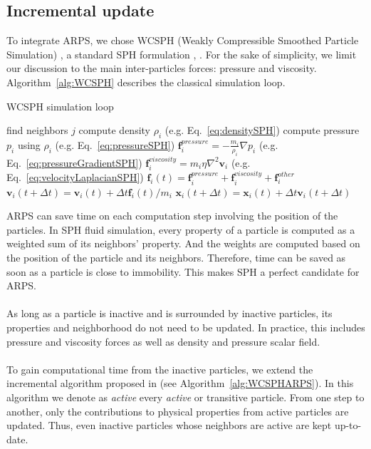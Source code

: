 \subsection{ Incremental update }
To integrate ARPS, we chose WCSPH (Weakly Compressible Smoothed Particle Simulation) \cite{Becker2007WCSPH}, a standard SPH formulation \cite{Desbrun1996}, \cite{Muller2003}. For the sake of simplicity, we limit our discussion to the main inter-particles forces: pressure and viscosity. 
Algorithm~\ref{alg:WCSPH} describes the classical simulation loop.

\newpage

\begin{algorithm}[H]
    \caption[ARPS: WCSPH simulation]{WCSPH simulation loop}
    \label{alg:WCSPH}
    \begin{algorithmic}
	    \State find neighbors $j$
    \EndFor
    \State compute density $\rho_{i}$ (e.g. Eq.~\ref{eq:densitySPH})
    \State compute pressure $p_{i}$ using $\rho_{i}$ (e.g. Eq.~\ref{eq:pressureSPH})
    \EndFor
    \State $\displaystyle \mathbf{f}_{i}^{pressure} = -\frac{m_{i}}{\rho_{i}}\nabla p_{i}$ (e.g. Eq.~\ref{eq:pressureGradientSPH})
    \State $\displaystyle \mathbf{f}_{i}^{viscosity} = m_{i}\eta\nabla^{2}\mathbf{v}_{i}$ (e.g. Eq.~\ref{eq:velocityLaplacianSPH})
    \State $\displaystyle \mathbf{f}_{i}(t) = \mathbf{f}_{i}^{pressure} + \mathbf{f}_{i}^{viscosity} + \mathbf{f}_{i}^{other}$
    \EndFor
    \State $\mathbf{v}_{i}(t+\Delta t) = \mathbf{v}_{i}(t) + \Delta t \mathbf{f}_{i}(t)/m_{i}$
    \State $\mathbf{x}_{i}(t+\Delta t) = \mathbf{x}_{i}(t) + \Delta t \mathbf{v}_{i}(t+\Delta t)$
    \EndFor
    \end{algorithmic}
\end{algorithm}

ARPS can save time on each computation step involving the position of the particles.
In SPH fluid simulation, every property of a particle is computed as a weighted sum of its neighbors' property.
And the weights are computed based on the position of the particle and its neighbors.
Therefore, time can be saved as soon as a particle is close to immobility. 
This makes SPH a perfect candidate for ARPS.
\\ \\
As long as a particle is inactive and is surrounded by inactive particles, its properties and neighborhood do not need to be updated.
In practice, this includes pressure and viscosity forces as well as density and pressure scalar field.
\\ \\
To gain computational time from the inactive particles, we extend the incremental algorithm proposed in \cite{Artemova2012} (see Algorithm~\ref{alg:WCSPHARPS}).
In this algorithm we denote as \emph{active} every \emph{active} or {transitive} particle.
From one step to another, only the contributions to physical properties from active particles are updated. 
Thus, even inactive particles whose neighbors are active are kept up-to-date.

